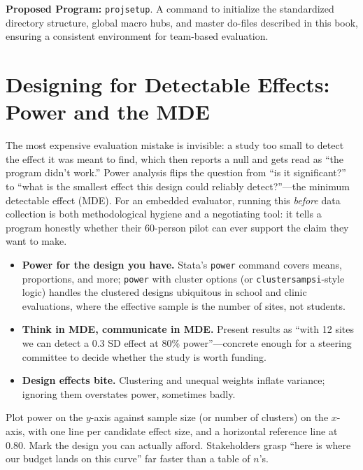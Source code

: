\documentclass[
    a4paper,
    fontsize=10pt,
    twoside=true,
    numbers=noenddot,
]{kaobook}
\newenvironment{vizcallout}[1][Visualization to build]{%
    \begin{vizbox}[frametitle={#1}]%
}{%
    \end{vizbox}%
}
\begin{document}
\begin{kaobox}[frametitle=Ado-file Idea: \texttt{projsetup}]
\textbf{Proposed Program:} \texttt{projsetup}. A command to initialize the standardized directory structure, global macro hubs, and master do-files described in this book, ensuring a consistent environment for team-based evaluation.
\end{kaobox}

\section{Designing for Detectable Effects: Power and the MDE}
The most expensive evaluation mistake is invisible: a study too small to detect the effect it was meant to find, which then reports a null and gets read as \enquote{the program didn't work.} Power analysis flips the question from \enquote{is it significant?} to \enquote{what is the smallest effect this design could reliably detect?}---the minimum detectable effect (MDE). For an embedded evaluator, running this \emph{before} data collection is both methodological hygiene and a negotiating tool: it tells a program honestly whether their 60-person pilot can ever support the claim they want to make.
\begin{itemize}
    \item \textbf{Power for the design you have.} Stata's \texttt{power} command covers means, proportions, and more; \texttt{power} with cluster options (or \texttt{clustersampsi}-style logic) handles the clustered designs ubiquitous in school and clinic evaluations, where the effective sample is the number of sites, not students.
    \item \textbf{Think in MDE, communicate in MDE.} Present results as \enquote{with 12 sites we can detect a 0.3 SD effect at 80\% power}---concrete enough for a steering committee to decide whether the study is worth funding.
    \item \textbf{Design effects bite.} Clustering and unequal weights inflate variance; ignoring them overstates power, sometimes badly.
\end{itemize}

\begin{vizcallout}[Visualization to build: the power curve]
Plot power on the $y$-axis against sample size (or number of clusters) on the $x$-axis, with one line per candidate effect size, and a horizontal reference line at 0.80. Mark the design you can actually afford. Stakeholders grasp \enquote{here is where our budget lands on this curve} far faster than a table of $n$'s.
\end{vizcallout}
\end{document}
